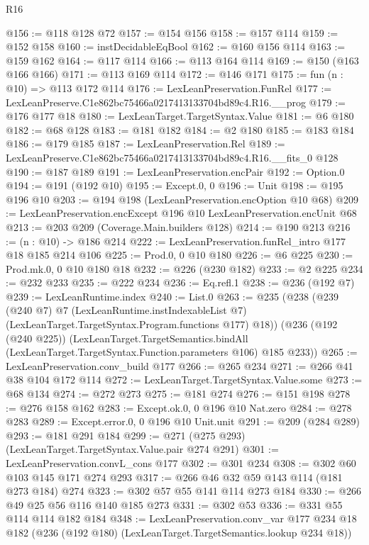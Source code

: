 \begin{lexlean}{R16}
\begin{coremodule}
@156 := @118 @128 @72
@157 := @154 @156
@158 := @157 @114
@159 := @152 @158
@160 := instDecidableEqBool
@162 := @160 @156 @114
@163 := @159 @162
@164 := @117 @114
@166 := @113 @164 @114
@169 := @150 (@163 @166 @166)
@171 := @113 @169 @114
@172 := @146 @171
@175 := fun (n : @10) => @113 @172 @114
@176 := LexLeanPreservation.FunRel
@177 := LexLeanPreserve.C1e862bc75466a0217413133704bd89c4.R16.__prog
@179 := @176 @177 @18
@180 := LexLeanTarget.TargetSyntax.Value
@181 := @6 @180
@182 := @68 @128
@183 := @181 @182
@184 := @2 @180
@185 := @183 @184
@186 := @179 @185
@187 := LexLeanPreservation.Rel
@189 := LexLeanPreserve.C1e862bc75466a0217413133704bd89c4.R16.__fits_0 @128
@190 := @187 @189
@191 := LexLeanPreservation.encPair
@192 := Option.{0}
@194 := @191 (@192 @10)
@195 := Except.{0, 0}
@196 := Unit
@198 := @195 @196 @10
@203 := @194 @198 (LexLeanPreservation.encOption @10 @68)
@209 := LexLeanPreservation.encExcept @196 @10 LexLeanPreservation.encUnit @68
@213 := @203 @209 (Coverage.Main.builders @128)
@214 := @190 @213
@216 := (n : @10) -> @186 @214
@222 := LexLeanPreservation.funRel_intro @177 @18 @185 @214 @106
@225 := Prod.{0, 0} @10 @180
@226 := @6 @225
@230 := Prod.mk.{0, 0} @10 @180 @18
@232 := @226 (@230 @182)
@233 := @2 @225
@234 := @232 @233
@235 := @222 @234
@236 := Eq.refl.{1}
@238 := @236 (@192 @7)
@239 := LexLeanRuntime.index
@240 := List.{0}
@263 := @235
    (@238
      (@239
        (@240 @7)
        @7
        (LexLeanRuntime.instIndexableList @7)
        (LexLeanTarget.TargetSyntax.Program.functions @177)
        @18))
    (@236
      (@192 (@240 @225))
      (LexLeanTarget.TargetSemantics.bindAll
        (LexLeanTarget.TargetSyntax.Function.parameters @106)
        @185
        @233))
@265 := LexLeanPreservation.conv_build @177
@266 := @265 @234
@271 := @266 @41 @38 @104 @172 @114
@272 := LexLeanTarget.TargetSyntax.Value.some
@273 := @68 @134
@274 := @272 @273
@275 := @181 @274
@276 := @151 @198
@278 := @276 @158 @162
@283 := Except.ok.{0, 0} @196 @10 Nat.zero
@284 := @278 @283
@289 := Except.error.{0, 0} @196 @10 Unit.unit
@291 := @209 (@284 @289)
@293 := @181 @291 @184
@299 := @271 (@275 @293) (LexLeanTarget.TargetSyntax.Value.pair @274 @291)
@301 := LexLeanPreservation.convL_cons @177
@302 := @301 @234
@308 := @302 @60 @103 @145 @171 @274 @293
@317 := @266 @46 @32 @59 @143 @114 (@181 @273 @184) @274
@323 := @302 @57 @55 @141 @114 @273 @184
@330 := @266 @49 @25 @56 @116 @140 @185 @273
@331 := @302 @53
@336 := @331 @55 @114 @114 @182 @184
@348 := LexLeanPreservation.conv_var
    @177
    @234
    @18
    @182
    (@236 (@192 @180) (LexLeanTarget.TargetSemantics.lookup @234 @18))

\end{coremodule}
\end{lexlean}
